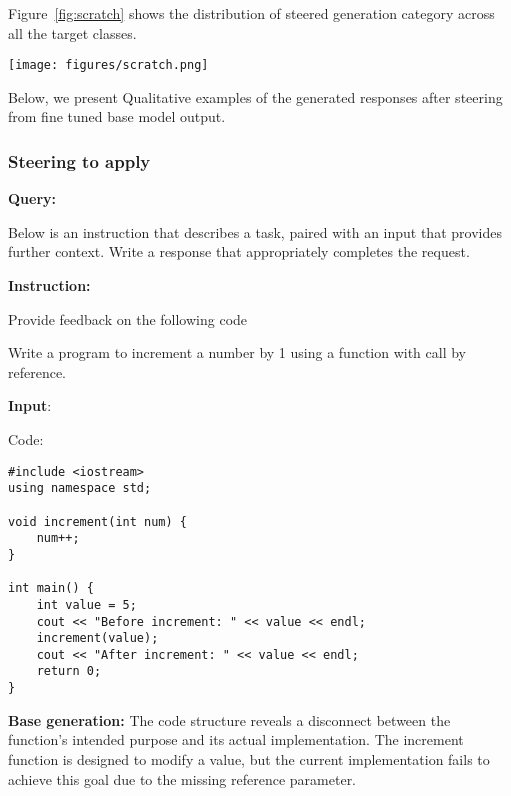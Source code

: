 Figure~\ref{fig:scratch} shows the distribution of steered generation category across all the target classes.

\begin{figure*}[ht]
\centering
  \texttt{[image: figures/scratch.png]}
  \caption{Measured class distribution showing steering accuracy from fine tuned base model output to target cognitive categories. Target classes appear on X-axis while Y-axis shows class category distribution of steered text.}
  \label{fig:scratch}
\end{figure*}



\label{sec:LLMoutput}
Below, we present Qualitative examples of the generated responses after steering from fine tuned base model output.







\medskip
\subsubsection*{Steering to apply}
\textbf{Query:}

Below is an instruction that describes a task, paired with an input that provides further context. Write a response that appropriately completes the request.\par
\textbf{Instruction:}\par
Provide feedback on the following code\par
Write a program to increment a number by 1 using a function with call by reference. \par
\textbf{Input}:\par
Code:
\begin{lstlisting}
#include <iostream>
using namespace std;

void increment(int num) {
    num++;
}

int main() {
    int value = 5;
    cout << "Before increment: " << value << endl;
    increment(value);
    cout << "After increment: " << value << endl;
    return 0;
}
\end{lstlisting}


\textbf{Base generation:} The code structure reveals a disconnect between the function's intended purpose and its actual implementation. The increment function is designed to modify a value, but the current implementation fails to achieve this goal due to the missing reference parameter.

